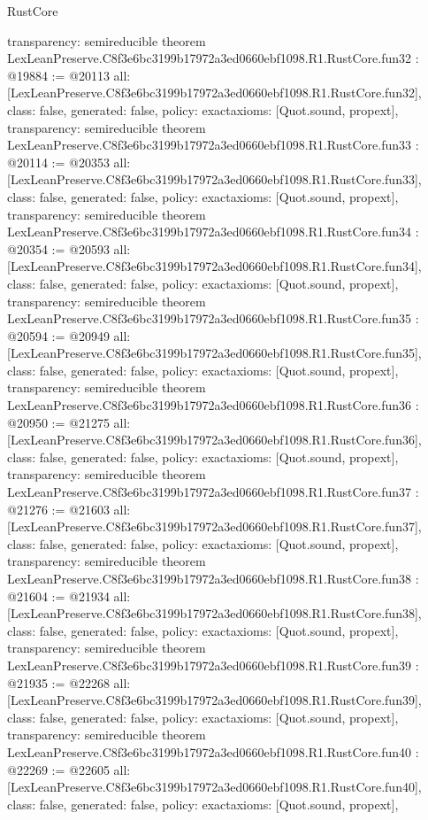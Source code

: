 \begin{lexlean}{RustCore}
\begin{coremodule}
{  transparency: semireducible
}
theorem LexLeanPreserve.C8f3e6bc3199b17972a3ed0660ebf1098.R1.RustCore.fun32 : @19884 := @20113 {
  all: [LexLeanPreserve.C8f3e6bc3199b17972a3ed0660ebf1098.R1.RustCore.fun32],
  class: false,
  generated: false,
  policy: exact{axioms: [Quot.sound, propext]},
  transparency: semireducible
}
theorem LexLeanPreserve.C8f3e6bc3199b17972a3ed0660ebf1098.R1.RustCore.fun33 : @20114 := @20353 {
  all: [LexLeanPreserve.C8f3e6bc3199b17972a3ed0660ebf1098.R1.RustCore.fun33],
  class: false,
  generated: false,
  policy: exact{axioms: [Quot.sound, propext]},
  transparency: semireducible
}
theorem LexLeanPreserve.C8f3e6bc3199b17972a3ed0660ebf1098.R1.RustCore.fun34 : @20354 := @20593 {
  all: [LexLeanPreserve.C8f3e6bc3199b17972a3ed0660ebf1098.R1.RustCore.fun34],
  class: false,
  generated: false,
  policy: exact{axioms: [Quot.sound, propext]},
  transparency: semireducible
}
theorem LexLeanPreserve.C8f3e6bc3199b17972a3ed0660ebf1098.R1.RustCore.fun35 : @20594 := @20949 {
  all: [LexLeanPreserve.C8f3e6bc3199b17972a3ed0660ebf1098.R1.RustCore.fun35],
  class: false,
  generated: false,
  policy: exact{axioms: [Quot.sound, propext]},
  transparency: semireducible
}
theorem LexLeanPreserve.C8f3e6bc3199b17972a3ed0660ebf1098.R1.RustCore.fun36 : @20950 := @21275 {
  all: [LexLeanPreserve.C8f3e6bc3199b17972a3ed0660ebf1098.R1.RustCore.fun36],
  class: false,
  generated: false,
  policy: exact{axioms: [Quot.sound, propext]},
  transparency: semireducible
}
theorem LexLeanPreserve.C8f3e6bc3199b17972a3ed0660ebf1098.R1.RustCore.fun37 : @21276 := @21603 {
  all: [LexLeanPreserve.C8f3e6bc3199b17972a3ed0660ebf1098.R1.RustCore.fun37],
  class: false,
  generated: false,
  policy: exact{axioms: [Quot.sound, propext]},
  transparency: semireducible
}
theorem LexLeanPreserve.C8f3e6bc3199b17972a3ed0660ebf1098.R1.RustCore.fun38 : @21604 := @21934 {
  all: [LexLeanPreserve.C8f3e6bc3199b17972a3ed0660ebf1098.R1.RustCore.fun38],
  class: false,
  generated: false,
  policy: exact{axioms: [Quot.sound, propext]},
  transparency: semireducible
}
theorem LexLeanPreserve.C8f3e6bc3199b17972a3ed0660ebf1098.R1.RustCore.fun39 : @21935 := @22268 {
  all: [LexLeanPreserve.C8f3e6bc3199b17972a3ed0660ebf1098.R1.RustCore.fun39],
  class: false,
  generated: false,
  policy: exact{axioms: [Quot.sound, propext]},
  transparency: semireducible
}
theorem LexLeanPreserve.C8f3e6bc3199b17972a3ed0660ebf1098.R1.RustCore.fun40 : @22269 := @22605 {
  all: [LexLeanPreserve.C8f3e6bc3199b17972a3ed0660ebf1098.R1.RustCore.fun40],
  class: false,
  generated: false,
  policy: exact{axioms: [Quot.sound, propext]},
}
\end{coremodule}
\end{lexlean}
